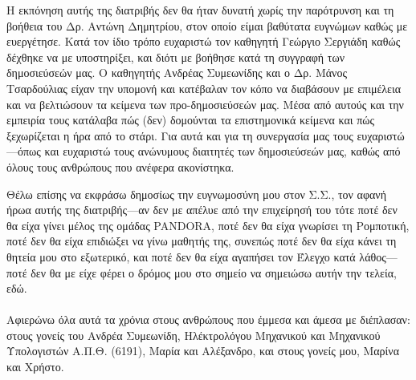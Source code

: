 \cleardoublepage

Η εκπόνηση αυτής της διατριβής δεν θα ήταν δυνατή χωρίς την παρότρυνση και τη
βοήθεια του Δρ. Αντώνη Δημητρίου, στον οποίο είμαι βαθύτατα ευγνώμων καθώς με
ευεργέτησε. Κατά τον ίδιο τρόπο ευχαριστώ τον καθηγητή Γεώργιο Σεργιάδη καθώς
δέχθηκε να με υποστηρίξει, και διότι με βοήθησε κατά τη συγγραφή των
δημοσιεύσεών μας. Ο καθηγητής Ανδρέας Συμεωνίδης και ο Δρ. Μάνος Τσαρδούλιας
είχαν την υπομονή και κατέβαλαν τον κόπο να διαβάσουν με επιμέλεια και να
βελτιώσουν τα κείμενα των προ-δημοσιεύσεών μας. Μέσα από αυτούς και την
εμπειρία τους κατάλαβα πώς (δεν) δομούνται τα επιστημονικά κείμενα και πώς
ξεχωρίζεται η ήρα από το στάρι. Για αυτά και για τη συνεργασία μας τους
ευχαριστώ---όπως και ευχαριστώ τους ανώνυμους διαιτητές των δημοσιεύσεών μας,
καθώς από όλους τους ανθρώπους που ανέφερα ακονίστηκα.

Θέλω επίσης να εκφράσω δημοσίως την ευγνωμοσύνη μου στον Σ.Σ., τον αφανή ήρωα
αυτής της διατριβής---αν δεν με απέλυε από την επιχείρησή του τότε ποτέ δεν θα
είχα γίνει μέλος της ομάδας PANDORA, ποτέ δεν θα είχα γνωρίσει τη Ρομποτική,
ποτέ δεν θα είχα επιδιώξει να γίνω μαθητής της, συνεπώς ποτέ δεν θα είχα κάνει
τη θητεία μου στο εξωτερικό, και ποτέ δεν θα είχα αγαπήσει τον Έλεγχο κατά
λάθος---ποτέ δεν θα με είχε φέρει ο δρόμος μου στο σημείο να σημειώσω αυτήν την
τελεία, εδώ.  \\ \\

Αφιερώνω όλα αυτά τα χρόνια στους ανθρώπους που έμμεσα και άμεσα με διέπλασαν:
στους γονείς του Ανδρέα Συμεωνίδη, Ηλέκτρολόγου Μηχανικού και Μηχανικού
Υπολογιστών Α.Π.Θ. (6191), Μαρία και Αλέξανδρο, και στους γονείς μου, Μαρίνα και
Χρήστο.

\restoregeometry
\cleardoublepage
